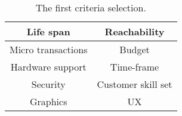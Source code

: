 
\begin{table}[ht]
    \centering
    \begin{tabular}{ |c|c| } 
        \hline
        Life span & Reachability \\
        \hline
          Micro transactions & Budget\\
          \hline
          Hardware support & Time-frame\\
          \hline
          Security & Customer skill set\\
          \hline
          Graphics & UX\\
        \hline
    \end{tabular}
    \caption{\label{tab:first-criteria-version} The first criteria selection.}
\end{table}
